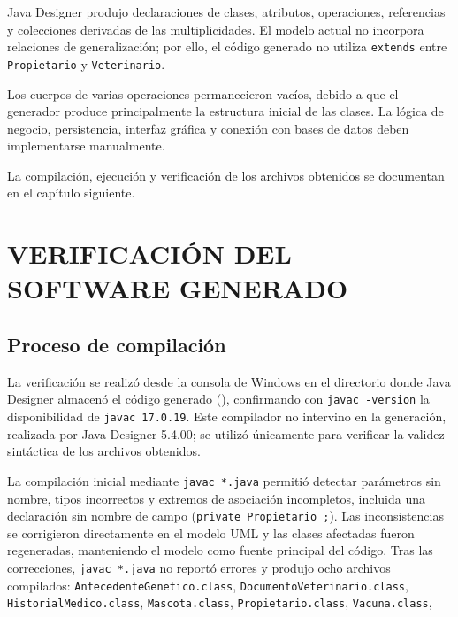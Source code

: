 \documentclass[10pt,a4paper,openany]{report}
\begin{document}
	Java Designer produjo declaraciones de clases, atributos, operaciones,
	referencias y colecciones derivadas de las multiplicidades. El modelo
	actual no incorpora relaciones de generalización; por ello, el código
	generado no utiliza \texttt{extends} entre
	\texttt{Propietario} y \texttt{Veterinario}.
	
	Los cuerpos de varias operaciones permanecieron vacíos, debido a que el
	generador produce principalmente la estructura inicial de las clases.
	La lógica de negocio, persistencia, interfaz gráfica y conexión con bases
	de datos deben implementarse manualmente.
	
	La compilación, ejecución y verificación de los archivos obtenidos se
	documentan en el capítulo siguiente.
	
	
	
	
	
	\chapter{VERIFICACIÓN DEL SOFTWARE GENERADO}
	
	\section{Proceso de compilación}
	
	La verificación se realizó desde la consola de Windows en el directorio
	donde Java Designer almacenó el código generado
	(), confirmando con
	\texttt{javac -version} la disponibilidad de \texttt{javac 17.0.19}.
	Este compilador no intervino en la generación, realizada por Java
	Designer 5.4.00; se utilizó únicamente para verificar la validez
	sintáctica de los archivos obtenidos.
	
	La compilación inicial mediante \texttt{javac *.java} permitió detectar
	parámetros sin nombre, tipos incorrectos y extremos de asociación
	incompletos, incluida una declaración sin nombre de campo
	(\texttt{private Propietario ;}). Las inconsistencias se corrigieron
	directamente en el modelo UML y las clases afectadas fueron
	regeneradas, manteniendo el modelo como fuente principal del código.
	Tras las correcciones, \texttt{javac *.java} no reportó errores y
	produjo ocho archivos compilados: \texttt{AntecedenteGenetico.class},
	\texttt{DocumentoVeterinario.class}, \texttt{HistorialMedico.class},
	\texttt{Mascota.class}, \texttt{Propietario.class}, \texttt{Vacuna.class},
	
\end{document}
